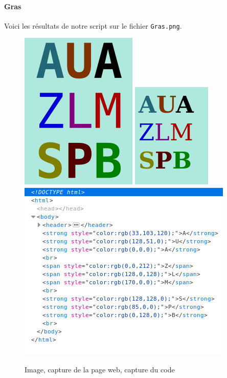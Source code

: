\documentclass[a4paper,12pt,titlepage]{report}
\begin{document}
	\paragraph{Gras}
	Voici les résultats de notre script sur le fichier \texttt{Gras.png}.
	\begin{figure}[h]
	\centering
		\includegraphics[height=0.25\textwidth]{../illus/Gras.png}
		\includegraphics[height=0.25\textwidth]{../illus/GrasR.png}
		\includegraphics[height=0.25\textwidth]{../illus/GrasC.png}
		\caption{Image, capture de la page web, capture du code}
	\end{figure}
\end{document}

